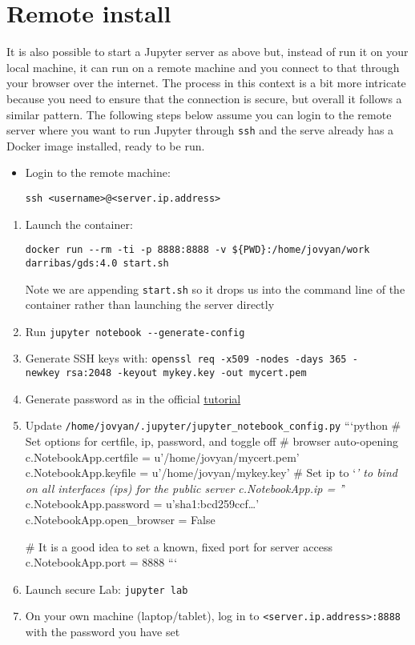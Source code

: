 \documentclass[
]{book}
\begin{document}
\hypertarget{remote-install}{%
\section{Remote install}\label{remote-install}}

It is also possible to start a Jupyter server as above but, instead of run it
on your local machine, it can run on a remote machine and you connect to that
through your browser over the internet. The process in this context is a bit
more intricate because you need to ensure that the connection is secure, but
overall it follows a similar pattern. The following steps below assume you can
login to the remote server where you want to run Jupyter through \texttt{ssh} and the
serve already has a Docker image installed, ready to be run.

\begin{itemize}
\item
  Login to the remote machine:

\begin{verbatim}
ssh <username>@<server.ip.address>
\end{verbatim}
\end{itemize}

\begin{enumerate}
\def\labelenumi{\arabic{enumi}.}
\item
  Launch the container:

\begin{verbatim}
docker run --rm -ti -p 8888:8888 -v ${PWD}:/home/jovyan/work darribas/gds:4.0 start.sh
\end{verbatim}

  Note we are appending \texttt{start.sh} so it drops us into
  the command line of the container rather than launching the server directly
\item
  Run \texttt{jupyter\ notebook\ -\/-generate-config}
\item
  Generate SSH keys with: \texttt{openssl\ req\ -x509\ -nodes\ -days\ 365\ -newkey\ rsa:2048\ -keyout\ mykey.key\ -out\ mycert.pem}
\item
  Generate password as in the official \href{http://jupyter-notebook.readthedocs.io/en/stable/public_server.html\#preparing-a-hashed-password}{tutorial}
\item
  Update \texttt{/home/jovyan/.jupyter/jupyter\_notebook\_config.py}
  ```python
  \# Set options for certfile, ip, password, and toggle off
  \# browser auto-opening
  c.NotebookApp.certfile = u'/home/jovyan/mycert.pem'
  c.NotebookApp.keyfile = u'/home/jovyan/mykey.key'
  \# Set ip to `\emph{' to bind on all interfaces (ips) for the public server
  c.NotebookApp.ip = '}'
  c.NotebookApp.password = u'sha1:bcd259ccf\ldots{}'
  c.NotebookApp.open\_browser = False

  \# It is a good idea to set a known, fixed port for server access
  c.NotebookApp.port = 8888
  ```
\item
  Launch secure Lab: \texttt{jupyter\ lab}
\item
  On your own machine (laptop/tablet), log in to \texttt{\textless{}server.ip.address\textgreater{}:8888} with the password you have set
\end{enumerate}
\end{document}
